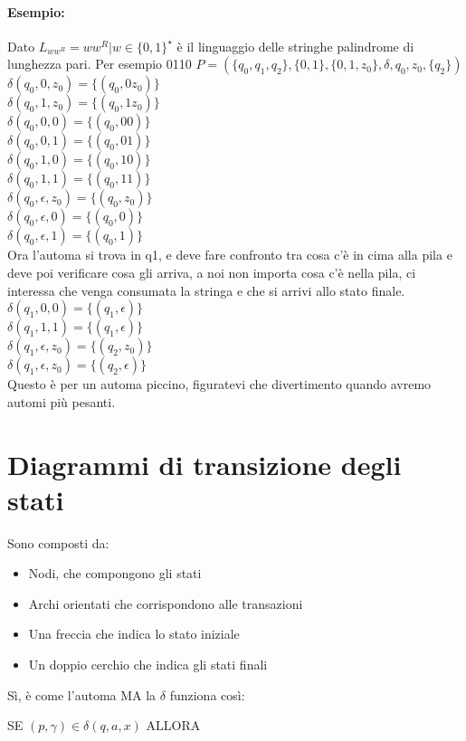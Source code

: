 \documentclass[12pt, a4paper, openany, oneside]{book}
\begin{document}
\paragraph{Esempio:} Dato $L_{ww^{R}} = {w w^{R} | w \in \{0,1\}^{\star}}$ è il 
linguaggio delle stringhe palindrome di lunghezza pari. Per esempio 0110
$P = (\{q_{0}, q_{1}, q_{2}\}, \{0,1\}, \{0,1, z_{0}\}, \delta, q_{0}, z_{0},\{q_{2}\})$\\
$\delta(q_{0}, 0, z_{0}) = \{(q_{0}, 0z_{0})\}$\\
$\delta(q_{0}, 1, z_{0}) = \{(q_{0}, 1z_{0})\}$\\
$\delta(q_{0}, 0, 0) = \{(q_{0}, 00)\}$\\
$\delta(q_{0}, 0, 1) = \{(q_{0}, 01)\}$\\
$\delta(q_{0}, 1, 0) = \{(q_{0}, 10)\}$\\
$\delta(q_{0}, 1, 1) = \{(q_{0}, 11)\}$\\
$\delta(q_{0}, \epsilon, z_{0}) = \{(q_{0}, z_{0})\}$\\
$\delta(q_{0}, \epsilon, 0) = \{(q_{0}, 0)\}$\\
$\delta(q_{0}, \epsilon, 1) = \{(q_{0}, 1)\}$\\
Ora l'automa si trova in q1, e deve fare confronto tra cosa c'è in cima alla pila 
e deve poi verificare cosa gli arriva, a noi non importa cosa c'è nella pila, 
ci interessa che venga consumata la stringa e che si arrivi allo stato finale.
$\delta(q_{1}, 0, 0) = \{(q_{1}, \epsilon)\}$\\
$\delta(q_{1}, 1, 1) = \{(q_{1}, \epsilon)\}$\\
$\delta(q_{1}, \epsilon, z_{0}) = \{(q_{2}, z_{0})\}$\\
$\delta(q_{1}, \epsilon, z_{0}) = \{(q_{2}, \epsilon)\}$\\
Questo è per un automa piccino, figuratevi che divertimento quando avremo automi
più pesanti. 
\section{Diagrammi di transizione degli stati}
Sono composti da:
\begin{itemize}
	\item Nodi, che compongono gli stati
	\item Archi orientati che corrispondono alle transazioni
	\item Una freccia che indica lo stato iniziale
	\item Un doppio cerchio che indica gli stati finali
\end{itemize}
Sì, è come l'automa MA la $\delta$ funziona così:
\begin{center}
SE $(p, \gamma) \in \delta(q, a, x)$ ALLORA 
\end{center}
\end{document}
